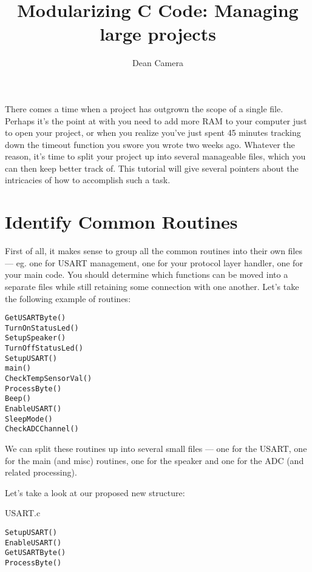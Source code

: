 \documentclass[a4paper,oneside,notitlepage]{article}
\begin{document}
\title{Modularizing C Code: Managing large projects}
\author{Dean Camera}

\maketitle

\tableofcontents
\cleardoublepage


There comes a time when a project has outgrown the scope of a single file. Perhaps it's the point at with you need to add more RAM to your computer just to open your project, or when you realize you've just spent 45 minutes tracking down the timeout function you swore you wrote two weeks ago. Whatever the reason, it's time to split your project up into several manageable files, which you can then keep better track of. This tutorial will give several pointers about the intricacies of how to accomplish such a task.

\section{Identify Common Routines}

First of all, it makes sense to group all the common routines into their own files --- eg. one for USART management, one for your protocol layer handler, one for your main code. You should determine which functions can be moved into a separate files while still retaining some connection with one another. Let's take the following example of routines:

\begin{center}
\begin{lstlisting}
GetUSARTByte()
TurnOnStatusLed()
SetupSpeaker()
TurnOffStatusLed()
SetupUSART()
main()
CheckTempSensorVal()
ProcessByte()
Beep()
EnableUSART()
SleepMode()
CheckADCChannel()
\end{lstlisting}
\end{center}

We can split these routines up into several small files --- one for the USART, one for the main (and misc) routines, one for the speaker and one for the ADC (and related processing).

Let's take a look at our proposed new structure:

USART.c
\begin{center}
\begin{lstlisting}
SetupUSART()
EnableUSART()
GetUSARTByte()
ProcessByte()
\end{lstlisting}
\end{center}
\end{document}
